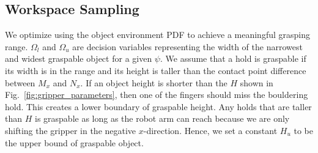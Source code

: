 \documentclass[letterpaper, 10 pt, conference]{ieeeconf}  %
\newcommand{\fig}[1]{Fig.~\ref{#1}}
\newcommand{\eq}[1]{(\ref{#1})}
\begin{document}

\subsection{Workspace Sampling\label{sec:workspace_samplling}}
We optimize using the object environment PDF to achieve a meaningful grasping range.
$\Omega_{l}$ and $\Omega_{u}$ are decision variables representing the width of the narrowest and widest graspable object for a given $\psi$. We assume that a hold is graspable if its width is in the range and its height is taller than the contact point difference between $M_x$ and $N_x$. If an object height is shorter than the $H$ shown in \fig{fig:gripper_parameters}, then one of the fingers should miss the bouldering hold. This creates a lower boundary of graspable height. Any holds that are taller than $H$ is graspable as long as the robot arm can reach because we are only shifting the gripper in the negative $x$-direction. Hence, we set a constant $H_u$ to be the upper bound of graspable object.
\end{document}

